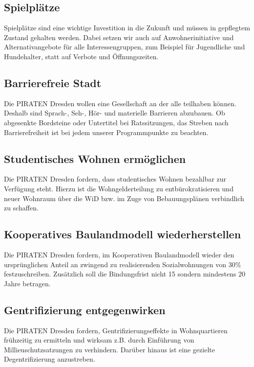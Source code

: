 \documentclass[a4paper, 11pt]{article}
\begin{document}
\subsection{Spielplätze}
Spielplätze sind eine wichtige Investition in die Zukunft und müssen in gepflegtem Zustand gehalten werden. Dabei setzen wir auch auf Anwohnerinitiative und Alternativangebote für alle Interessengruppen, zum Beispiel für Jugendliche und Hundehalter, statt auf Verbote und Öffnungszeiten.


\subsection{Barrierefreie Stadt}
Die PIRATEN Dresden wollen eine Gesellschaft an der alle teilhaben können. Deshalb sind Sprach-, Seh-, Hör- und materielle Barrieren abzubauen. Ob abgesenkte Bordsteine oder Untertitel bei Ratssitzungen, das Streben nach Barrierefreiheit ist bei jedem unserer Programmpunkte zu beachten.


\subsection{Studentisches Wohnen ermöglichen}
Die PIRATEN Dresden fordern, dass studentisches Wohnen bezahlbar zur Verfügung steht. Hierzu ist die Wohngelderteilung zu entbürokratisieren und neuer Wohnraum über die WiD bzw. im Zuge von Bebauungsplänen verbindlich zu schaffen.


\subsection{Kooperatives Baulandmodell wiederherstellen}
Die PIRATEN Dresden fordern, im Kooperativen Baulandmodell wieder den ursprünglichen Anteil an zwingend zu realisierenden Sozialwohnungen von 30\% festzuschreiben. Zusätzlich soll die Bindungsfrist nicht 15 sondern mindestens 20 Jahre betragen.


\subsection{Gentrifizierung entgegenwirken}
Die PIRATEN Dresden fordern, Gentrifizierungseffekte in Wohnquartieren frühzeitig zu ermitteln und wirksam z.B. durch Einführung von Millieuschutzsatzungen zu verhindern. Darüber hinaus ist eine gezielte Degentrifizierung anzustreben.
\end{document}
